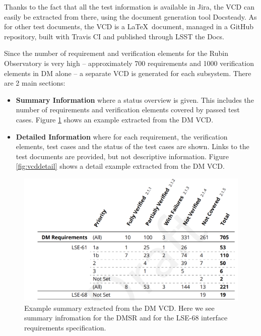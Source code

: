 Thanks to the fact that all the test information is available in Jira, the VCD can easily be extracted from there,
using the document generation tool Docsteady.
As for other test documents, the VCD is a \LaTeX~document, managed in a GitHub repository, built with Travis CI and published through LSST the Docs.

Since the number of requirement and verification elements for the Rubin Observatory is very high --
approximately 700 requirements and 1000 verification elements in DM alone -- a separate VCD is generated for each subsystem.
There are 2 main sections:

\begin{itemize}
\item \textbf{Summary Information} where a status overview is given.
This includes the number of requirements and verification elements covered by passed test cases.
Figure \ref{fig:vcdsum} shows an example extracted from the DM VCD.
\item \textbf{Detailed Information} where for each requirement, the verification elements, test cases
and the status of the test cases are shown. Links to the test documents are provided, but not descriptive information.
Figure \ref{fig:vcddetail} shows a detail example extracted from the DM VCD.
\end{itemize}

\begin{figure}
\begin{center}
\includegraphics[width=\textwidth]{imgs/VCDsumm.png}
 \caption{Example summary extracted from the DM VCD. 
 Here we see summary infromation for the DMSR \cite{LSE-61} and for the LSE-68 interface requirements specification\cite{LSE-68}.}
 \label{fig:vcdsum}
\end{center}
\end{figure}

